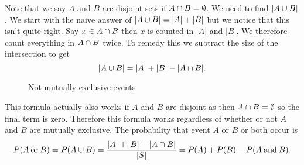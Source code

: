     Note that we say \(A\) and \(B\) are disjoint sets if \(A\cap B = \emptyset\).
    We need to find \(|A\cup B|\).
    We start with the naive answer of \(|A\cup B| = |A| + |B|\) but we notice that this isn't quite right.
    Say \(x\in A\cap B\) then \(x\) is counted in \(|A|\) and \(|B|\).
    We therefore count everything in \(A\cap B\) twice.
    To remedy this we subtract the size of the intersection to get
    \[|A\cup B| = |A| + |B| - |A\cap B|.\]
    \begin{figure}[ht]
        \centering
        \caption{Not mutually exclusive events}
        \label{fig:not mutually exclusive events}
    \end{figure}
    This formula actually also works if \(A\) and \(B\) are disjoint as then \(A\cap B = \emptyset\) so the final term is zero.
    Therefore this formula works regardless of whether or not \(A\) and \(B\) are mutually exclusive.
    The probability that event \(A\) or \(B\) or both occur is
    \[P(A\mathbin{\operatorname{or}} B) = P(A\cup B) = \frac{|A| + |B| - |A\cap B|}{|S|} = P(A) + P(B) - P(A\mathbin{\operatorname{and}} B).\]
    
